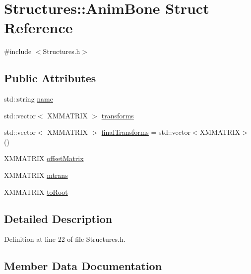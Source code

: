 \hypertarget{struct_structures_1_1_anim_bone}{}\section{Structures\+:\+:Anim\+Bone Struct Reference}
\label{struct_structures_1_1_anim_bone}


{\ttfamily \#include $<$Structures.\+h$>$}

\subsection*{Public Attributes}
\begin{DoxyCompactItemize}
\item 
std\+::string \mbox{\hyperlink{struct_structures_1_1_anim_bone_ac0a9d5a95ead3e49f1dfd03ae96c658e}{name}}
\item 
std\+::vector$<$ X\+M\+M\+A\+T\+R\+IX $>$ \mbox{\hyperlink{struct_structures_1_1_anim_bone_aa2cec56089e60aad7d8c6e334146a6aa}{transforms}}
\item 
std\+::vector$<$ X\+M\+M\+A\+T\+R\+IX $>$ \mbox{\hyperlink{struct_structures_1_1_anim_bone_a8314d5c27f33909b07e15e8981278ed7}{final\+Transforms}} = std\+::vector$<$X\+M\+M\+A\+T\+R\+IX$>$()
\item 
X\+M\+M\+A\+T\+R\+IX \mbox{\hyperlink{struct_structures_1_1_anim_bone_ac5babe148e2b6202657026ebd0aa4d2c}{offset\+Matrix}}
\item 
X\+M\+M\+A\+T\+R\+IX \mbox{\hyperlink{struct_structures_1_1_anim_bone_a1bf93045ef5b789f1fd32c871b684f4e}{mtrans}}
\item 
X\+M\+M\+A\+T\+R\+IX \mbox{\hyperlink{struct_structures_1_1_anim_bone_a029088abf71c971fda76aea1bd304a32}{to\+Root}}
\end{DoxyCompactItemize}


\subsection{Detailed Description}


Definition at line 22 of file Structures.\+h.



\subsection{Member Data Documentation}
\mbox{\label{struct_structures_1_1_anim_bone_a8314d5c27f33909b07e15e8981278ed7}} 
